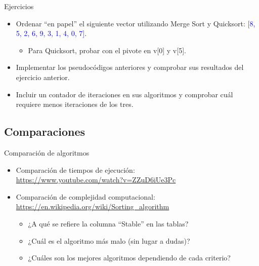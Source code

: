 \documentclass{beamer} %
\newcommand{\blue}[1]{\textcolor{blue}{#1}}
\begin{document}
\begin{frame}{Ejercicios}
    \begin{itemize}
        \item Ordenar ``en papel'' el siguiente vector utilizando Merge Sort y Quicksort: \blue{[8, 5, 2, 6, 9, 3, 1, 4, 0, 7]}.
        \begin{itemize}
            \item Para Quicksort, probar con el pivote en v[0] y v[5].
        \end{itemize}
        \item Implementar los pseudocódigos anteriores y comprobar sus resultados del ejercicio anterior.
        \item Incluir un contador de iteraciones en sus algoritmos y comprobar cuál requiere menos iteraciones de los tres.
    \end{itemize}
\end{frame}

\subsection{Comparaciones}

\begin{frame}{Comparación de algoritmos}
    \begin{itemize}
        \item Comparación de tiempos de ejecución:\\
        \blue{\url{https://www.youtube.com/watch?v=ZZuD6iUe3Pc}}
        \item Comparación de complejidad computacional:\\
        \blue{\url{https://en.wikipedia.org/wiki/Sorting_algorithm}}
        \begin{itemize}
            \item ¿A qué se refiere la columna ``Stable'' en las tablas?
            \item ¿Cuál es el algoritmo más malo (sin lugar a dudas)?
            \item ¿Cuáles son los mejores algoritmos dependiendo de cada criterio?
        \end{itemize}
    \end{itemize}
\end{frame}

\end{document}
